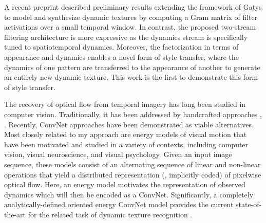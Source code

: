A recent preprint \cite{funke2017} described preliminary 
results extending the framework of Gatys \etal \cite{gatys2015} 
to model and  synthesize dynamic textures by computing a Gram 
matrix of filter activations over a small temporal window.
In contrast, the proposed two-stream filtering architecture is more 
expressive as the dynamics stream is specifically tuned to 
spatiotemporal dynamics.
Moreover, the factorization
in terms of appearance and dynamics enables a novel form of
style transfer, where the dynamics of one pattern are 
transferred to the appearance of another to generate an
entirely new dynamic texture.
This work is the first to demonstrate this form of style transfer.

The recovery of optical flow from temporal imagery has long been
studied in computer vision.
Traditionally, it has been addressed by handcrafted approaches
\eg, \cite{horn1981,lucas1981,revaud2015epicflow}.
Recently, ConvNet approaches \cite{dosovitskiy2015,ranjan2017,ilg2017,yu2016}
have been demonstrated as viable alternatives.
Most closely related to my approach are energy models of visual
motion \cite{adelson1985spatiotemporal,heeger1988,simoncelli1998,nishimoto2011,derpanis2012spacetime,konda2014}
that have been motivated and studied in a variety of contexts,
including computer vision, visual neuroscience, and visual
psychology.
Given an input image sequence, these models consist of an
alternating sequence of linear and non-linear operations that yield
a distributed representation (\ie,  implicitly coded) of pixelwise
optical flow.
Here, an energy model motivates the
representation of observed dynamics which will then be encoded
as a ConvNet. Significantly, a completely analytically-defined
oriented energy ConvNet model provides the current state-of-the-art
for the related task of dynamic texture recognition \cite{hadji2017}.